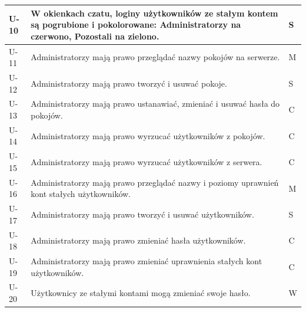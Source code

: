 \documentclass[11pt,oneside,a4paper,titlepage,onecolumn]{article}
\begin{document}
\begin{tabular}{ | l | l | l | }
    \hline
    U-10 & \parbox[t]{14cm}{
      W okienkach czatu, loginy użytkowników ze stałym kontem są pogrubione i pokolorowane: Administratorzy na czerwono,
      Pozostali na zielono. 
      } & S \\

    \hline
    U-11 & \parbox[t]{14cm}{
      Administratorzy mają prawo przeglądać nazwy pokojów na serwerze. 
    } & M \\

    \hline
    U-12 & \parbox[t]{14cm}{
      Administratorzy mają prawo tworzyć i usuwać pokoje. 
    } & S \\

    \hline
    U-13 & \parbox[t]{14cm}{
      Administratorzy mają prawo ustanawiać, zmieniać i usuwać hasła do pokojów. 
    } & C \\

    \hline
    U-14 & \parbox[t]{14cm}{
      Administratorzy mają prawo wyrzucać użytkowników z pokojów. 
    } & C \\

    \hline
    U-15 & \parbox[t]{14cm}{
      Administratorzy mają prawo wyrzucać użytkowników z serwera. 
    } & C \\

    \hline
    U-16 & \parbox[t]{14cm}{
      Administratorzy mają prawo przeglądać nazwy i poziomy uprawnień kont stałych użytkowników. 
    } & M \\

    \hline
    U-17 & \parbox[t]{14cm}{
      Administratorzy mają prawo tworzyć i usuwać użytkowników. 
    } & S \\

    \hline
    U-18 & \parbox[t]{14cm}{
      Administratorzy mają prawo zmieniać hasła użytkowników. 
    } & C \\

    \hline
    U-19 & \parbox[t]{14cm}{
      Administratorzy mają prawo zmieniać uprawnienia stałych kont użytkowników. 
    } & C \\

    \hline
    U-20 & \parbox[t]{14cm}{
      Użytkownicy ze stałymi kontami mogą zmieniać swoje hasło.
    } & W \\

    
    \hline
  \end{tabular}
\end{document}
